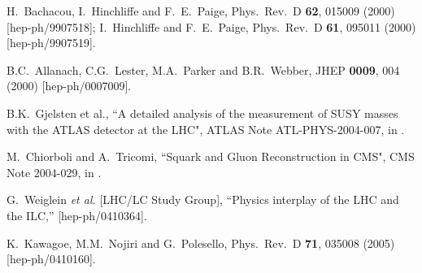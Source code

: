 \documentclass[11pt]{article}
\begin{document}
\begin{thebibliography}{999}
H.~Bachacou, I.~Hinchliffe and F.~E.~Paige,
  Phys.\ Rev.\ D {\bf 62}, 015009 (2000)
  [hep-ph/9907518];
I.~Hinchliffe and F.~E.~Paige,
  Phys.\ Rev.\ D {\bf 61}, 095011 (2000)
  [hep-ph/9907519].
  
B.C.~Allanach, C.G.~Lester, M.A.~Parker and B.R.~Webber,
  JHEP {\bf 0009}, 004 (2000)
  [hep-ph/0007009].

B.K.~Gjelsten et al., ``A detailed analysis of the measurement of SUSY 
masses with the ATLAS detector at the LHC", ATLAS Note ATL-PHYS-2004-007, 
in \cite{LHCILCstudy}.

M.~Chiorboli and A.~Tricomi, ``Squark and Gluon Reconstruction in CMS",
CMS Note 2004-029, in \cite{LHCILCstudy}.

G.~Weiglein {\it et al.}  [LHC/LC Study Group],
  ``Physics interplay of the LHC and the ILC,''
  [hep-ph/0410364].

K.~Kawagoe, M.M.~Nojiri and G.~Polesello,
  Phys.\ Rev.\ D {\bf 71}, 035008 (2005)
  [hep-ph/0410160].






\end{thebibliography}
\end{document}
